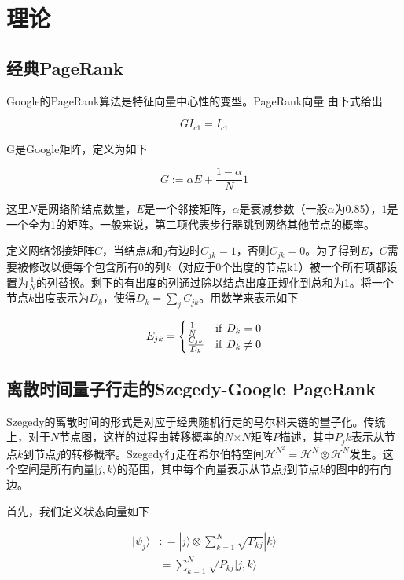 \section{理论}
\subsection{经典PageRank}
Google的PageRank算法是特征向量中心性的变型。PageRank向量 由下式给出

\begin{equation}
	GI_{c1}=I_{c1}
\end{equation}

G是Google矩阵，定义为如下

\begin{equation}
	G:=\alpha E+\frac{1-\alpha}{N}1
\end{equation}

这里$N$是网络阶结点数量，$E$是一个邻接矩阵，$\alpha$是衰减参数（一般$\alpha$为0.85），$1$是一个全为1的矩阵。一般来说，第二项代表步行器跳到网络其他节点的概率。

定义网络邻接矩阵$C$，当结点$k$和$j$有边时$C_{jk}=1$，否则$C_{jk}=0$。为了得到$E$，$C$需要被修改以便每个包含所有0的列$k$（对应于0个出度的节点k1）被一个所有项都设置为$\frac{1}{N}$的列替换。剩下的有出度的列通过除以结点出度正规化到总和为1。将一个节点$k$出度表示为$D_k$，使得$D_k=\sum_{j}C_{jk}$。用数学来表示如下

\begin{equation}
	E_{jk}=\begin{cases}
	\frac{1}{N} & {\rm if}\ D_k=0\\
	\frac{C_{jk}}{D_k} & {\rm if}\ D_k\neq 0
	\end{cases}
\end{equation}

\subsection{离散时间量子行走的Szegedy-Google PageRank}

Szegedy的离散时间的形式是对应于经典随机行走的马尔科夫链的量子化。传统上，对于$N$节点图，这样的过程由转移概率的$N$×$N$矩阵$P$描述，其中$P_jk$表示从节点$k$到节点$j$的转移概率。Szegedy行走在希尔伯特空间$\mathcal { H } ^ { N ^ { 2 } } = \mathcal { H } ^ { N } \otimes \mathcal { H } ^ { N }$发生。这个空间是所有向量$| j , k \rangle$的范围，其中每个向量表示从节点$j$到节点$k$的图中的有向边。

首先，我们定义状态向量如下

\begin{equation}
	\begin{aligned} | \psi _ { j } \rangle & : = | j \rangle \otimes \sum _ { k = 1 } ^ { N } \sqrt { P _ { k j } } | k \rangle \\ & = \sum _ { k = 1 } ^ { N } \sqrt { P _ { k j } } | j , k \rangle \end{aligned}
\end{equation}

